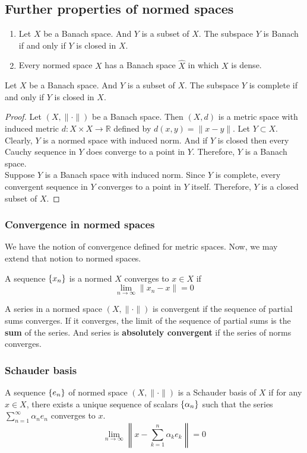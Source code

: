 \subsection{Further properties of normed spaces}
\begin{enumerate}
	\item Let $X$ be a Banach space.
		And $Y$ is a subset of $X$.
		The subspace $Y$ is Banach if and only if $Y$ is closed in $X$.
	\item Every normed space $X$ has a Banach space $\hat{X}$ in which $X$ is dense.
\end{enumerate}
\begin{theorem}
	Let $X$ be a Banach space.
	And $Y$ is a subset of $X$.
	The subspace $Y$ is complete if and only if $Y$ is closed in $X$.
\end{theorem}
\begin{proof}
	Let $(X,\|\cdot\|)$ be a Banach space.
	Then $(X,d)$ is a metric space with induced metric $d : X \times X \to \mathbb{R}$ defined by $d(x,y) = \| x-y \|$.
	Let $Y \subset X$.
	Clearly, $Y$ is a normed space with induced norm.
	And if $Y$ is closed then every Cauchy sequence in $Y$ does converge to a point in $Y$.
	Therefore, $Y$ is a Banach space.\\

	Suppose $Y$ is a Banach space with induced norm.
	Since $Y$ is complete, every convergent sequence in $Y$ converges to a point in $Y$ itself.
	Therefore, $Y$ is a closed subset of $X$.
\end{proof}

\subsubsection{Convergence in normed spaces}
We have the notion of convergence defined for metric spaces.
Now, we may extend that notion to normed spaces.
\begin{definition}[convergence]
	A sequence $\{x_n\}$ is a normed $X$ converges to $x \in X$ if
	$$ \lim_{n \to \infty} \| x_n-x \| = 0 $$
\end{definition}

A series in a normed space $(X,\|\cdot\|)$ is convergent if the sequence of partial sums converges.
If it converges, the limit of the sequence of partial sums is the \textbf{sum} of the series.
And series is \textbf{absolutely convergent} if the series of norms converges.
\subsubsection{Schauder basis}
\begin{definition}
	A sequence $\{e_n\}$ of normed space $(X,\|\cdot\|)$ is a Schauder basis of $X$ if for any $x  \in X$, there exists a unique sequence of scalars $\{\alpha_n\}$ such that the series $\displaystyle \sum_{n = 1}^\infty \alpha_n e_n$ converges to $x$.
	$$ \lim_{n \to \infty} \left\| x - \sum_{k = 1}^n \alpha_k e_k \right\| = 0 $$
\end{definition}

